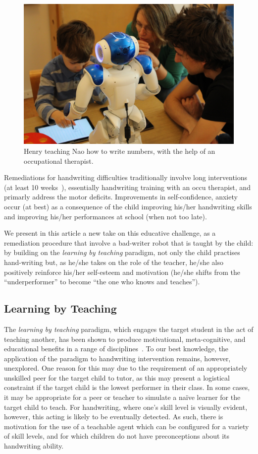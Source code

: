 \documentclass{article}
\begin{document}
\begin{figure}
    \centering
    \includegraphics[width=0.9\linewidth]{henry}
    \caption{\small Henry teaching Nao how to write numbers, with the help of an
    occupational therapist.}
    \label{fig:henry}
\end{figure}

Remediations for handwriting difficulties traditionally involve
long interventions (at least 10 weeks~\cite{Hoy2011}), essentially handwriting
training with an occu therapist, and primarly address the motor deficits.
Improvements in self-confidence, anxiety occur (at best) as a consequence of the
child improving his/her handwriting skills and improving his/her performances at
school (when not too late).

We present in this article a new take on this educative challenge, as a
remediation procedure that involve a bad-writer robot that is taught by the
child: by building on the \emph{learning by teaching} paradigm, not only the
child practises hand-writing but, as he/she takes on the role of the teacher,
he/she also positively reinforce his/her self-esteem and motivation (he/she
shifts from the ``underperformer'' to become ``the one who knows and teaches'').

\subsection{Learning by Teaching}

The \emph{learning by teaching} paradigm, which engages the target student in
the act of teaching another, has been shown to produce motivational,
meta-cognitive, and educational benefits in a range of disciplines~\cite{Rohrbeck2003}. 
To our best knowledge, the application of the paradigm to
handwriting intervention remains, however, unexplored. One reason for this may
due to the requirement of an appropriately unskilled peer for the target child
to tutor, as this may present a logistical constraint if the target child is the
lowest performer in their class.  In some cases, it may be appropriate for a
peer or teacher to simulate a na\"ive learner for the target child to teach.
For handwriting, where one's skill level is visually evident, however, this
acting is likely to be eventually detected. As such, there is motivation for the
use of a teachable agent which can be configured for a variety of skill levels,
and for which children do not have preconceptions about its handwriting ability.
\end{document}
